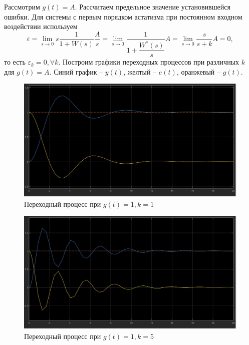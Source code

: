 \documentclass[a4paper, 12pt]{article}
\begin{document}
    Рассмотрим $g(t)=A$. Рассчитаем предельное значение установившейся ошибки.
    Для системы с первым порядком астатизма при постоянном входном воздействии используем
    $$\varepsilon=\lim\limits_{s\rightarrow0}s\dfrac{1}{1+W(s)}\dfrac{A}{s}=\lim\limits_{s\rightarrow0}\dfrac{1}{1+\dfrac{W^*(s)}{s}}A=\lim\limits_{s\rightarrow0}\dfrac{s}{s+k}A=0,$$
    то есть $\varepsilon_k=0,\forall k$. Построим графики переходных процессов при различных $k$ для $g(t)=A$. Синий график -- $y(t)$, желтый -- $e(t)$, оранжевый -- $g(t)$.
    \begin{figure}[H]
        \centering
        \includegraphics[scale=0.3]{task_2_g=1_k=1.jpg}
        \captionsetup{skip=0pt}
        \caption{Переходный процесс при $g(t)=1,k=1$}
        \label{fig:t2g1k1}
    \end{figure}
    \begin{figure}[H]
        \centering
        \includegraphics[scale=0.3]{task_2_g=1_k=5.jpg}
        \captionsetup{skip=0pt}
        \caption{Переходный процесс при $g(t)=1,k=5$}
        \label{fig:t2g1k5}
    \end{figure}
\end{document}
